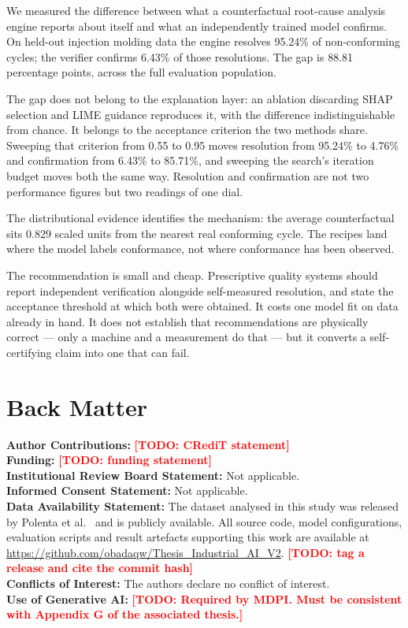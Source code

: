 \documentclass[11pt,a4paper]{article}
\newcommand{\TODO}[1]{\textcolor{red}{\textbf{[TODO: #1]}}}
\begin{document}
We measured the difference between what a counterfactual root-cause analysis engine reports about itself and what an independently trained model confirms. On held-out injection molding data the engine resolves 95.24\% of non-conforming cycles; the verifier confirms 6.43\% of those resolutions. The gap is 88.81 percentage points, across the full evaluation population.

The gap does not belong to the explanation layer: an ablation discarding SHAP selection and LIME guidance reproduces it, with the difference indistinguishable from chance. It belongs to the acceptance criterion the two methods share. Sweeping that criterion from 0.55 to 0.95 moves resolution from 95.24\% to 4.76\% and confirmation from 6.43\% to 85.71\%, and sweeping the search's iteration budget moves both the same way. Resolution and confirmation are not two performance figures but two readings of one dial.

The distributional evidence identifies the mechanism: the average counterfactual sits 0.829 scaled units from the nearest real conforming cycle. The recipes land where the model labels conformance, not where conformance has been observed.

The recommendation is small and cheap. Prescriptive quality systems should report independent verification alongside self-measured resolution, and state the acceptance threshold at which both were obtained. It costs one model fit on data already in hand. It does not establish that recommendations are physically correct --- only a machine and a measurement do that --- but it converts a self-certifying claim into one that can fail.

\section*{Back Matter}

\noindent\textbf{Author Contributions:} \TODO{CRediT statement}\\
\textbf{Funding:} \TODO{funding statement}\\
\textbf{Institutional Review Board Statement:} Not applicable.\\
\textbf{Informed Consent Statement:} Not applicable.\\
\textbf{Data Availability Statement:} The dataset analysed in this study was released by Polenta et al.~\cite{polenta2022} and is publicly available. All source code, model configurations, evaluation scripts and result artefacts supporting this work are available at \url{https://github.com/obadaqw/Thesis_Industrial_AI_V2}. \TODO{tag a release and cite the commit hash}\\
\textbf{Conflicts of Interest:} The authors declare no conflict of interest.\\
\textbf{Use of Generative AI:} \TODO{Required by MDPI. Must be consistent with Appendix G of the associated thesis.}
\end{document}
